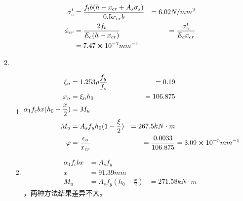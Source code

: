 \documentclass{article}
\begin{document}
\begin{enumerate}
\begin{enumerate}[1.]
\begin{enumerate}
\begin{align*}
                                  \sigma_c^t & =\frac{f_tb(h-x_{cr}+A_s\sigma_s)}{0.5x_{cr}b}                                              & =6.02N/mm^2                   \\
                                  \phi_{cr}  & =\frac{2f_t}{E_c(h-x_{cr})}                                                                 & =\frac{\sigma_c^t}{E_cx_{cr}} \\
                                             & =7.47\cross10^{-7}mm^{-1}
                              \end{align*}
                    \end{enumerate}
              \item \begin{enumerate}
                        \item \begin{align*}
                                  \xi_n                          & =1.253\rho\frac{f_y}{f_c}   & =0.19                                               \\
                                  x_n                            & =\xi_nh_0                   & =106.875                                            \\
                                  \alpha_1f_cbx(h_0-\frac{x}{2}) & =M_u                                                                              \\
                                  M_u                            & =A_sf_yh_0(1-\frac{\xi}{2}) & =267.5kN\cdot m                                     \\
                                  \varphi                        & =\frac{\epsilon_u}{x_{cr}}  & =\frac{0.0033}{106.875} & =3.09\cross10^{-5}mm^{-1}
                              \end{align*}
                        \item \begin{align*}
                                  \alpha_1f_cbx & =A_sf_y                                     \\
                                  x             & =91.39mm                                    \\
                                  M_u           & =A_sf_y(h_0-\frac{x}{2}) & =271.58kN\cdot m
                              \end{align*}
                              ，两种方法结果差异不大。
                    \end{enumerate}

\end{enumerate}
\end{enumerate}
\end{document}
